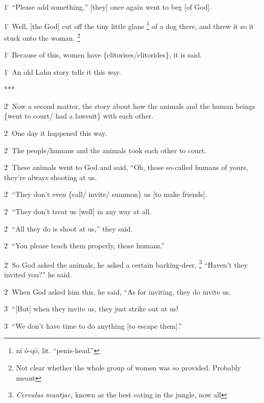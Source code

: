 1\. ``Please add something,'' [they] once again went to beg [of God].

1\. Well, [the God] cut off the tiny little glans \footnote{nī ó-qō, lit. ``penis-head.''} of a dog there, and threw
it so it stuck onto the woman. \footnote{Not clear whether the whole group of women was so provided. Probably meant}

1\. Because of this, women have \{clitorises/clitorides\}, it is said.

1\. An old Lahu story tells it this way.

***

2\. Now a second matter, the story about how the animals and the human beings \{went
to court/ had a lawsuit\} with each other.

2\. One day it happened this way.

2\. The people/humans and the animals took each other to court.

2\. These animals went to God and said, ``Oh, those so-called humans of yours,
they're always shooting at us.

2\. ``They don't even \{call/ invite/ summon\} us [to make friends].

2\. ``They don't treat us [well] in any way at all.

2\. ``All they do is shoot at us,'' they said.

2\. ``You please teach them properly, those humans.''

2\. So God asked the animals, he asked a certain barking-deer, \footnote{\textit{Cervulus muntjac}, known as the best eating in the jungle, now all} ``Haven't they
invited you?'' he said.

2\. When God asked him this, he said, ``As for inviting, they do invite us.

3\. ``[But] when they invite us, they just strike out at us!

3\. ``We don't have time to do anything [to escape them].''

